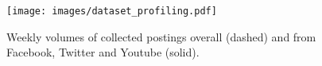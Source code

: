 
\begin{figure}[!tbp]
		\texttt{[image: images/dataset\_profiling.pdf]}
	\caption{
		Weekly volumes of collected postings overall (dashed) and from Facebook, Twitter and Youtube (solid).
	}
	\label{fig:dataset_profiling}
\end{figure}
